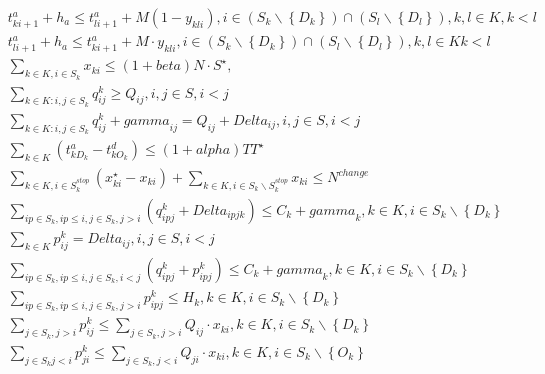 \begin{align}
  & t_{k i + 1}^{a} + h_{a} \leq t_{l i + 1}^{a} + M \left(1 - y_{k l i}\right) , i \in \left(S_{k} \backslash \left\{D_{k}\right\}\right) \cap \left(S_{l} \backslash \left\{D_{l}\right\}\right) , k , l \in K , k < l \tag{eq\_0014} \\
  & t_{l i + 1}^{a} + h_{a} \leq t_{k i + 1}^{a} + M \cdot y_{k l i} , i \in \left(S_{k} \backslash \left\{D_{k}\right\}\right) \cap \left(S_{l} \backslash \left\{D_{l}\right\}\right) , k , l \in K k < l \tag{eq\_0015} \\
  & \sum_{k \in K, i \in S_{k}} x_{k i} \leq \left(1 + \mathit{beta}\right) N \cdot S^{\star} , \tag{eq\_0021} \\
  & \sum_{k \in K : i , j \in S_{k}} q_{i j}^{k} \geq Q_{i j} , i , j \in S , i < j \tag{eq\_0023} \\
  & \sum_{k \in K : i , j \in S_{k}} q_{i j}^{k} + \mathit{gamma}_{i j} = Q_{i j} + \mathit{Delta}_{i j} , i , j \in S , i < j \tag{eq\_0024} \\
  & \sum_{k \in K} \left(t_{k D_{k}}^{a} - t_{k O_{k}}^{d}\right) \leq \left(1 + \mathit{alpha}\right) \mathit{TT}^{\star} \tag{eq\_0025} \\
  & \sum_{k \in K, i \in S_{k}^{s t o p}} \left(x_{k i}^{\star} - x_{k i}\right) + \sum_{k \in K, i \in S_{k} \backslash S_{k}^{s t o p}} x_{k i} \leq N^{c h a n g e} \tag{eq\_0026} \\
  & \sum_{ip \in S_{k} , ip \leq i, j \in S_{k} , j > i} \left(q_{ip j}^{k} + \mathit{Delta}_{ip \mathit{jk}}\right) \leq C_{k} + \mathit{gamma}_{k} , k \in K , i \in S_{k} \backslash \left\{D_{k}\right\} \tag{eq\_0029} \\
  & \sum_{k \in K} p_{i j}^{k} = \mathit{Delta}_{i j} , i , j \in S , i < j \tag{eq\_0032} \\
  & \sum_{ip \in S_{k} , ip \leq i, j \in S_{k} , i < j} \left(q_{ip j}^{k} + p_{ip j}^{k}\right) \leq C_{k} + \mathit{gamma}_{k} , k \in K , i \in S_{k} \backslash \left\{D_{k}\right\} \tag{eq\_0033} \\
  & \sum_{ip \in S_{k} , ip \leq i, j \in S_{k} , j > i} p_{ip j}^{k} \leq H_{k} , k \in K , i \in S_{k} \backslash \left\{D_{k}\right\} \tag{eq\_0034} \\
  & \sum_{j \in S_{k} , j > i} p_{\mathit{ij}}^{k} \leq \sum_{j \in S_{k} , j > i} Q_{\mathit{ij}} \cdot x_{\mathit{ki}} , k \in K , i \in S_{k} \backslash \left\{D_{k}\right\} \tag{eq\_0035} \\
  & \sum_{j \in S_{k} j < i} p_{\mathit{ji}}^{k} \leq \sum_{j \in S_{k} , j < i} Q_{\mathit{ji}} \cdot x_{\mathit{ki}} , k \in K , i \in S_{k} \backslash \left\{O_{k}\right\} \tag{eq\_0036} \\
\end{align}
